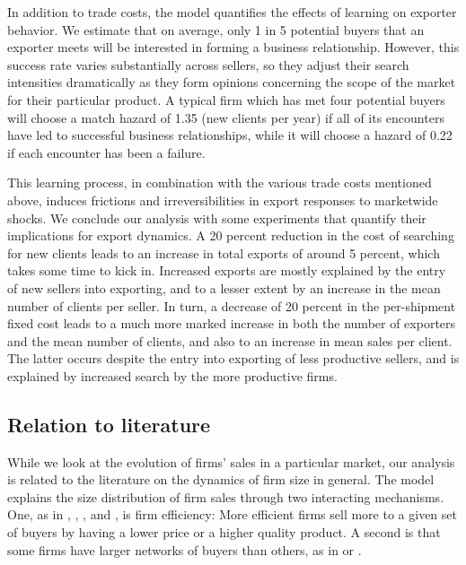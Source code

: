 In addition to trade costs, the model quantifies the effects of learning on
exporter behavior. We estimate that on average, only 1 in 5 potential buyers
that an exporter meets will be interested in forming a business
relationship. However, this success rate varies substantially across
sellers, so they adjust their search intensities dramatically as they form
opinions concerning the scope of the market for their particular product. A
typical firm which has met four potential buyers will choose a match hazard
of 1.35 (new clients per year) if all of its encounters have led to
successful business relationships, while it will choose a hazard of 0.22 if
each encounter has been a failure.

This learning process, in combination with the various trade costs mentioned
above, induces frictions and irreversibilities in export responses to
marketwide shocks. We conclude our analysis with some experiments that
quantify their implications for export dynamics. A 20 percent reduction in
the cost of searching for new clients leads to an increase in total exports
of around 5 percent, which takes some time to kick in. Increased exports are
mostly explained by the entry of new sellers into exporting, and to a lesser
extent by an increase in the mean number of clients per seller. In turn, a
decrease of 20 percent in the per-shipment fixed cost leads to a much more
marked increase in both the number of exporters and the mean number of
clients, and also to an increase in mean sales per client. The latter occurs
despite the entry into exporting of less productive sellers, and is
explained by increased search by the more productive firms.

\subsection{Relation to literature}

While we look at the evolution of firms' sales in a particular market, our
analysis is related to the literature on the dynamics of firm size in
general. The model explains the size distribution of firm sales through two
interacting mechanisms. One, as in \citet{melitz2003impact}, \citet{bernard2003plants},
\citet{luttmer2007selection}, and \citet{irarrazabal2006hysteresis}, is firm efficiency:
More efficient firms sell more to a given set of buyers by having a lower
price or a higher quality product. A second is that some firms have larger
networks of buyers than others, as in \citet{JacksonRogers07} or \citet{Chaney11}.

